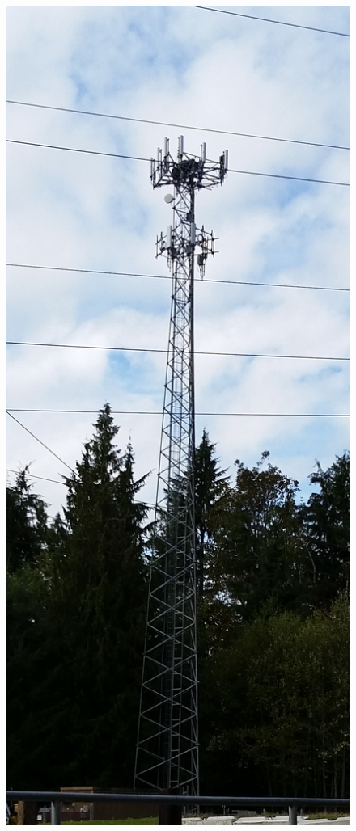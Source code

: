 \documentclass{llncs}
\begin{document}
\begin{figure}[H]
    \centering
    \begin{minipage}{0.45\textwidth}
        \centering
        \includegraphics[scale = 0.128]{torre.jpeg}

\end{minipage}
\end{figure}
\end{document}
